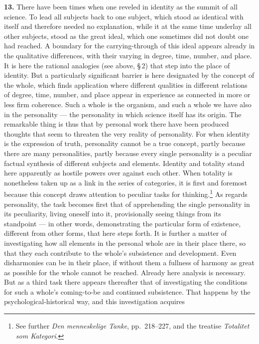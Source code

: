 \documentclass[12pt]{book}
\newcommand{\hnum}[1]{\textbf{#1.}\enspace}
\newcommand{\opage}[1]{\marginnote{\footnotesize\textit{[#1]}}}
\begin{document}
\hnum{13} There have been times when one reveled in identity as the summit of all science. To lead
all subjects \opage{42}back to one subject, which stood as identical with itself and therefore needed no
explanation, while it at the same time underlay all other subjects, stood as the great ideal, which
one sometimes did not doubt one had reached. A boundary for the carrying-through of this ideal appears
already in the qualitative differences, with their varying in degree, time, number, and place. It is
here the rational analogies (see above, \S\,2) that step into the place of identity. But a
particularly significant barrier is here designated by the concept of the whole, which finds
application where different qualities in different relations of degree, time, number, and place appear
in experience as connected in more or less firm coherence. Such a whole is the organism, and such a
whole we have also in the personality --- the personality in which science itself has its origin. The
remarkable thing is thus that by personal work there have been produced thoughts that seem to threaten
the very reality of personality. For when identity is the expression of truth, personality cannot be a
true concept, partly because there are many personalities, partly because every single personality is
a peculiar factual synthesis of different subjects and elements. Identity and totality stand here
apparently as hostile powers over against each other. When totality is nonetheless taken up as a link
in the series of categories, it is first and foremost because this concept draws attention to peculiar
tasks for thinking.\footnote{See further \textit{Den menneskelige Tanke}, pp.\ 218--227, and the
treatise \textit{Totalitet som Kategori}.} As regards personality, the task becomes first that of
apprehending the single personality in its peculiarity, living oneself into it, provisionally seeing
things from its standpoint --- in other words, demonstrating the particular form of existence, different
from other forms, that \opage{43}here steps forth. It is further a matter of investigating how all elements in
the personal whole are in their place there, so that they each contribute to the whole's subsistence
and development. Even disharmonies can be in their place, if without them a fullness of harmony as
great as possible for the whole cannot be reached. Already here analysis is necessary. But as a third
task there appears thereafter that of investigating the conditions for such a whole's coming-to-be and
continued subsistence. That happens by the psychological-historical way, and this investigation acquires
\end{document}
